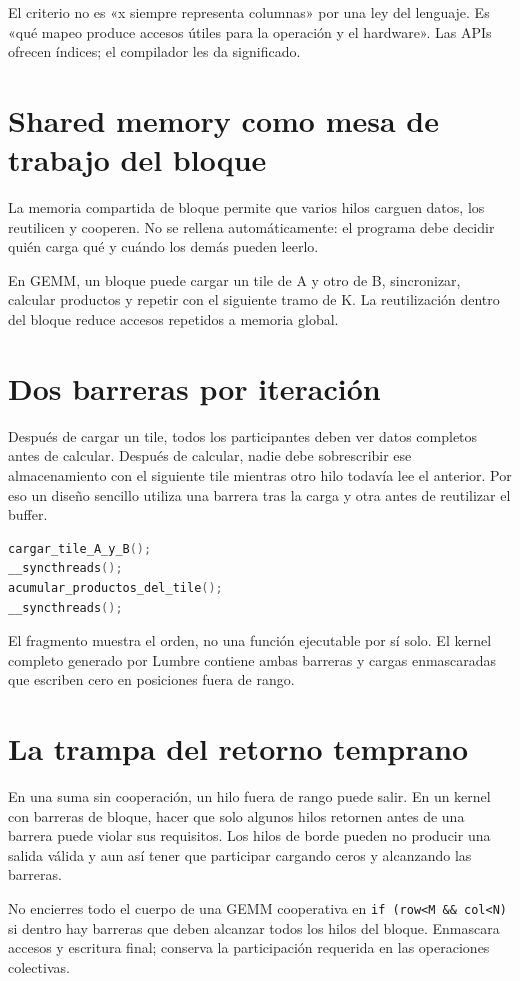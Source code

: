 \documentclass[12pt,a4paper,oneside]{report}
\begin{document}
El criterio no es «x siempre representa columnas» por una ley del lenguaje. Es «qué mapeo produce accesos útiles para la operación y el hardware». Las APIs ofrecen índices; el compilador les da significado.

\section{Shared memory como mesa de trabajo del bloque}
La memoria compartida de bloque permite que varios hilos carguen datos, los reutilicen y cooperen. No se rellena automáticamente: el programa debe decidir quién carga qué y cuándo los demás pueden leerlo.

En GEMM, un bloque puede cargar un tile de A y otro de B, sincronizar, calcular productos y repetir con el siguiente tramo de K. La reutilización dentro del bloque reduce accesos repetidos a memoria global.

\section{Dos barreras por iteración}
Después de cargar un tile, todos los participantes deben ver datos completos antes de calcular. Después de calcular, nadie debe sobrescribir ese almacenamiento con el siguiente tile mientras otro hilo todavía lee el anterior. Por eso un diseño sencillo utiliza una barrera tras la carga y otra antes de reutilizar el buffer.

\begin{lstlisting}[language=C++]
cargar_tile_A_y_B();
__syncthreads();
acumular_productos_del_tile();
__syncthreads();
\end{lstlisting}
El fragmento muestra el orden, no una función ejecutable por sí solo. El kernel completo generado por Lumbre contiene ambas barreras y cargas enmascaradas que escriben cero en posiciones fuera de rango.

\section{La trampa del retorno temprano}
En una suma sin cooperación, un hilo fuera de rango puede salir. En un kernel con barreras de bloque, hacer que solo algunos hilos retornen antes de una barrera puede violar sus requisitos. Los hilos de borde pueden no producir una salida válida y aun así tener que participar cargando ceros y alcanzando las barreras.

\begin{cuidado}
No encierres todo el cuerpo de una GEMM cooperativa en \texttt{if (row<M \&\& col<N)} si dentro hay barreras que deben alcanzar todos los hilos del bloque. Enmascara accesos y escritura final; conserva la participación requerida en las operaciones colectivas.

\end{cuidado}
\end{document}
